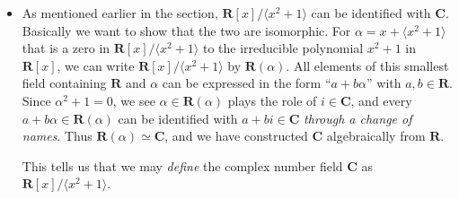 \documentclass[11pt]{article}
\newcommand{\R}{\mathbf{R}}
\newcommand{\C}{\mathbf{C}}
\newcommand{\la}{\langle}
\newcommand{\ra}{\rangle}
\begin{document}
\begin{itemize}
\begin{proof}
        The uniqueness of expression of $\beta$ clearly has to do with the minimal degree $n$ of $p(x)$. Suppose \[\beta = b_0 + b_1 \alpha + \dots + b_{n-1} \alpha^{n-1} = b_0' + b_1' \alpha + \dots +b_{n-1}' \alpha^{n-1},\] then \[(b_0 - b_0') + (b_1 - b_1') \alpha + \dots + (b_{n-1} - b_{n-1}')\alpha^{n-1} = 0.\] It is then obvious that $\alpha$ is a zero to the polynomial $(b_0 - b_0') + (b_1 - b_1') x + \dots + (b_{n-1} - b_{n-1}')x^{n-1} \in F[x]$, which is of degree $\leq n-1 < n = \deg(p)$, if this polynomial is nonzero. This leads to contradiction, and thus the polynomial from subtraction must be the zero polynomial, showing that the expression of $\beta \in E$ must be unique.
    \end{proof}
    \item As mentioned earlier in the section, $\R[x]/\la x^2+1 \ra$ can be identified with $\C$. Basically we want to show that the two are isomorphic. For $\alpha = x + \la x^2+1 \ra$ that is a zero in $\R[x]/\la x^2+1 \ra$ to the irreducible polynomial $x^2+1$ in $\R[x]$, we can write $\R[x]/\la x^2+1 \ra$ by $\R(\alpha)$. All elements of this smallest field containing $\R$ and $\alpha$ can be expressed in the form ``$a+b\alpha$'' with $a,b \in \R$. Since $\alpha^2 + 1 = 0$, we see $\alpha \in \R(\alpha)$ plays the role of $i \in \C$, and every $a+b\alpha \in \R(\alpha)$ can be identified with $a+bi \in \C$ \emph{through a change of names}. Thus $\R(\alpha) \simeq \C$, and we have constructed $\C$ algebraically from $\R$.
    
    This tells us that we may \emph{define} the complex number field $\C$ as $\R[x]/\la x^2 + 1 \ra$.
\end{itemize}
\end{document}
